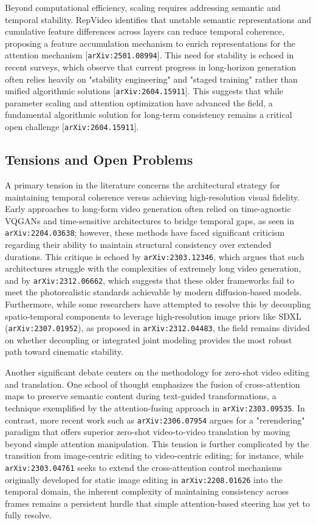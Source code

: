 \documentclass[11pt]{article}
\begin{document}
Beyond computational efficiency, scaling requires addressing semantic and temporal stability. RepVideo identifies that unstable semantic representations and cumulative feature differences across layers can reduce temporal coherence, proposing a feature accumulation mechanism to enrich representations for the attention mechanism [\texttt{arXiv:2501.08994}]. This need for stability is echoed in recent surveys, which observe that current progress in long-horizon generation often relies heavily on "stability engineering" and "staged training" rather than unified algorithmic solutions [\texttt{arXiv:2604.15911}]. This suggests that while parameter scaling and attention optimization have advanced the field, a fundamental algorithmic solution for long-term consistency remains a critical open challenge [\texttt{arXiv:2604.15911}].

\subsection{Tensions and Open Problems}

A primary tension in the literature concerns the architectural strategy for maintaining temporal coherence versus achieving high-resolution visual fidelity. Early approaches to long-form video generation often relied on time-agnostic VQGANs and time-sensitive architectures to bridge temporal gaps, as seen in \texttt{arXiv:2204.03638}; however, these methods have faced significant criticism regarding their ability to maintain structural consistency over extended durations. This critique is echoed by \texttt{arXiv:2303.12346}, which argues that such architectures struggle with the complexities of extremely long video generation, and by \texttt{arXiv:2312.06662}, which suggests that these older frameworks fail to meet the photorealistic standards achievable by modern diffusion-based models. Furthermore, while some researchers have attempted to resolve this by decoupling spatio-temporal components to leverage high-resolution image priors like SDXL (\texttt{arXiv:2307.01952}), as proposed in \texttt{arXiv:2312.04483}, the field remains divided on whether decoupling or integrated joint modeling provides the most robust path toward cinematic stability.

Another significant debate centers on the methodology for zero-shot video editing and translation. One school of thought emphasizes the fusion of cross-attention maps to preserve semantic content during text-guided transformations, a technique exemplified by the attention-fusing approach in \texttt{arXiv:2303.09535}. In contrast, more recent work such as \texttt{arXiv:2306.07954} argues for a "rerendering" paradigm that offers superior zero-shot video-to-video translation by moving beyond simple attention manipulation. This tension is further complicated by the transition from image-centric editing to video-centric editing; for instance, while \texttt{arXiv:2303.04761} seeks to extend the cross-attention control mechanisms originally developed for static image editing in \texttt{arXiv:2208.01626} into the temporal domain, the inherent complexity of maintaining consistency across frames remains a persistent hurdle that simple attention-based steering has yet to fully resolve.
\end{document}
